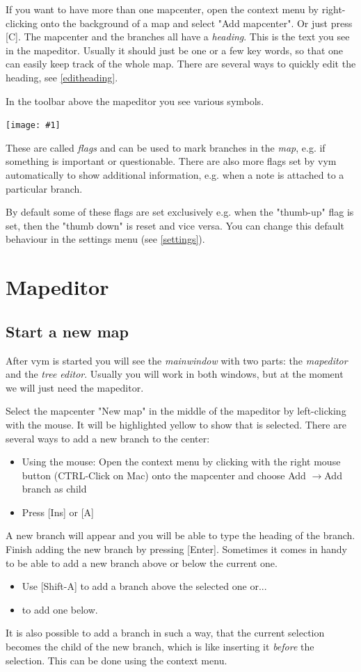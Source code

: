 \documentclass[12pt,a4paper]{article}
\newcommand{\maximage}[1]{  
    \begin{center}
        \texttt{[image: \#1]} 
    \end{center}
}
\newcommand{\vym}{{\sc vym }}
\newcommand{\ra}{$\longrightarrow$}
\newcommand{\key}[1]{[#1]}
\begin{document}
If you want to have more than one mapcenter, open the context menu by
right-clicking onto the background of a map and select "Add mapcenter".
Or just press \key{C}.
The mapcenter and the branches all have a {\em heading}. This is the
text you see in the mapeditor. Usually it should just be one or a few
key words, so that one can easily keep track of the whole map.
There are several ways to quickly edit the heading, see
\ref{editheading}.


In the toolbar above the mapeditor you see various symbols.
    \maximage{images/default-flags.png}
These are called {\em flags} and can be used to mark branches in the
{\em map}, e.g. if something is important or questionable.  There are
also more flags set by \vym automatically to show additional
information, e.g. when a note is attached to a  particular branch.

By default some of these flags are set exclusively e.g. when the 
"thumb-up" flag is set, then the "thumb down" is reset and vice
versa. You can change this default behaviour in the settings menu (see
\ref{settings}).

\section{Mapeditor} \label {mapeditor}
\subsection{Start a new map}
After \vym is started you will see the {\em mainwindow} with two parts: the {\em mapeditor} and the
{\em tree editor}. Usually you will work in both windows, but at the
moment we will just need the mapeditor. 

Select the mapcenter "New map" in the middle of the mapeditor by
left-clicking with the mouse. It will be highlighted yellow to show that
is selected. There are several ways to add a new branch to the center:
\begin{itemize}
    \item Using the mouse: Open the context menu by clicking with the
    right mouse button (CTRL-Click on Mac) onto the
    mapcenter and choose Add \ra Add branch as child
    \item Press \key{Ins} or \key{A}
\end{itemize}
A new branch will appear and you will be able to type the heading of the
branch. Finish adding the new branch by pressing \key{Enter}.
Sometimes it comes in handy to be able to add a new branch above or
below the current one. 
\begin{itemize}
    \item Use \key{Shift-A} to add a branch above the selected one or... 
    \item \key{Ctrl-A} to add one below. 
\end{itemize}
It is also possible to add a branch in such a way, that the current
selection becomes the child of the new branch, which is like inserting
it {\em before} the selection. This can be done using the context menu.
\end{document}
